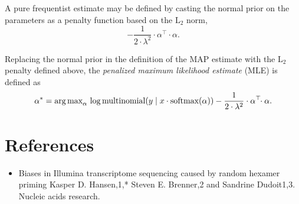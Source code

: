 \documentclass[11pt]{article}
\begin{document}
A pure frequentist estimate may be defined by casting the normal prior
on the parameters as a penalty function based on the $\textrm{L}_2$
norm,
\[
  -\frac{1}{2 \cdot \lambda^2} \cdot \alpha^{\top}\!\! \cdot \alpha.
\]

Replacing the normal prior in the definition of the MAP estimate with
the $\textrm{L}_2$ penalty defined above, the
\emph{penalized maximum likelihood estimate} (MLE) is defined as
\[
  \alpha^* = \textrm{arg\,max}_{\alpha} \,
  \log \textrm{multinomial}(y \mid x \cdot \textrm{softmax}(\alpha))
  - \frac{1}{2 \cdot \lambda^2} \cdot \alpha^{\top}\!\! \cdot \alpha.
\]


\section*{References}

\begin{itemize}
\item Biases in Illumina transcriptome sequencing caused by random
  hexamer priming Kasper D. Hansen,1,* Steven E. Brenner,2 and
  Sandrine Dudoit1,3.  Nucleic acids research.
\end{itemize}
\end{document}
